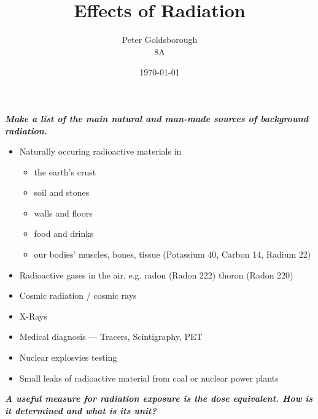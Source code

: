 



\thispagestyle{plain}

\title{\Huge Effects of Radiation}

\author {
Peter Goldsborough\\
8A
}

\date{\today}

\maketitle

\textbf{\emph{Make a list of the main natural and man-made sources of background radiation.}}

\begin{itemize}

		\begin{itemize}
			\item Naturally occuring radioactive materials in
				  \begin{itemize}
				  		\item the earth's crust
				  		\item soil and stones
				  		\item walls and floors
				  		\item food and drinks
				  		\item our bodies' muscles, bones, tissue (Potassium 40, Carbon 14, Radium 22)
				  \end{itemize}
			\item Radioactive gases in the air, e.g. radon (Radon 222) thoron (Radon 220)
			\item Cosmic radiation / cosmic rays
		\end{itemize}


		\begin{itemize}
			\item X-Rays
			\item Medical diagnosis --- Tracers, Scintigraphy, PET
			\item Nuclear explosvies testing
			\item Small leaks of radioactive material from coal or nuclear power plants
		\end{itemize}
\end{itemize}

\textbf{\emph{A useful measure for radiation exposure is the dose equivalent. How is it determined and what is its unit?}}

